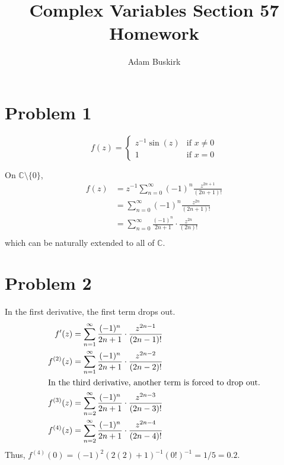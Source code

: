 \documentclass{article}
\author{Adam Buskirk}
\title{Complex Variables Section 57 Homework}
\begin{document}
\maketitle

\section{Problem 1}
\[ 
f(z)=\begin{cases}
z^{-1}\sin(z) & \text{if } x \neq 0 \\
1 & \text{if } x = 0
\end{cases}
\]

On $\mathbb{C} \setminus \{0\}$, 
\begin{align*}
f(z) 
&= z^{-1} \sum_{n=0}^\infty (-1)^n \frac{z^{2n+1}}{(2n+1)!} \\
&= \sum_{n=0}^\infty (-1)^n \frac{z^{2n}}{(2n+1)!} \\
&= \sum_{n=0}^\infty \frac{(-1)^n}{2n+1} \cdot \frac{z^{2n}}{(2n)!} \\
\end{align*}
which can be naturally extended to all of $\mathbb{C}$.
\section{Problem 2}
In the first derivative, the first term drops out.
\begin{align*}
f'(z)
&= \sum_{n=1}^\infty \frac{(-1)^n}{2n+1} \cdot \frac{z^{2n-1}}{(2n-1)!} \\
f^{(2)}(z)
&= \sum_{n=1}^\infty \frac{(-1)^n}{2n+1} \cdot \frac{z^{2n-2}}{(2n-2)!} \\
\intertext{In the third derivative, another term is forced to drop out.}
f^{(3)}(z)
&= \sum_{n=2}^\infty \frac{(-1)^n}{2n+1} \cdot \frac{z^{2n-3}}{(2n-3)!} \\
f^{(4)}(z)
&= \sum_{n=2}^\infty \frac{(-1)^n}{2n+1} \cdot \frac{z^{2n-4}}{(2n-4)!} \\
\end{align*}
Thus, 
$f^{(4)}(0) = (-1)^2 (2 (2) + 1)^{-1} (0!)^{-1} = 1 / 5 = 0.2$.
\end{document}
